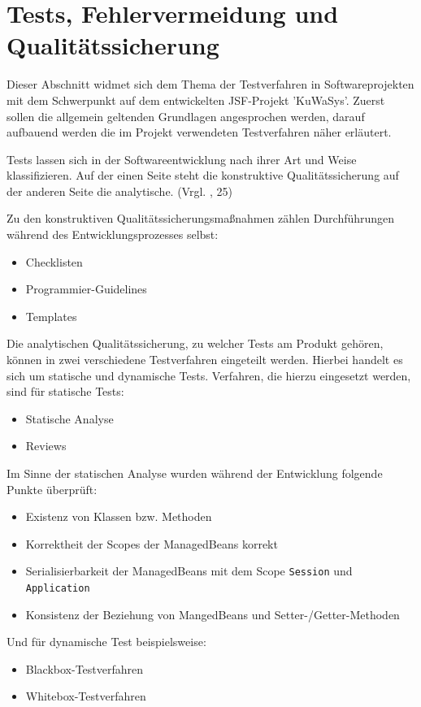 \section{Tests, Fehlervermeidung und Qualitätssicherung}\label{sec:Testing und Debugging}

Dieser Abschnitt widmet sich dem Thema der Testverfahren in Softwareprojekten mit dem Schwerpunkt auf dem entwickelten JSF-Projekt 'KuWaSys'.
Zuerst sollen die allgemein geltenden Grundlagen angesprochen werden, darauf aufbauend werden die im Projekt verwendeten Testverfahren näher erläutert. 

Tests lassen sich in der Softwareentwicklung nach ihrer Art und Weise klassifizieren.
Auf der einen Seite steht die konstruktive Qualitätssicherung auf der anderen Seite die analytische.
(Vrgl. \cite{RaM-ST}, 25) 

Zu den konstruktiven Qualitätssicherungsmaßnahmen zählen Durchführungen während des Entwicklungsprozesses selbst:
\begin{itemize}
  \item Checklisten
  \item Programmier-Guidelines
  \item Templates
\end{itemize}

Die analytischen Qualitätssicherung, zu welcher Tests am Produkt gehören, können in zwei verschiedene Testverfahren eingeteilt werden. Hierbei handelt es sich um statische und dynamische Tests.
Verfahren, die hierzu eingesetzt werden, sind für statische Tests:
\begin{itemize}
  \item Statische Analyse
  \item Reviews
\end{itemize}

Im Sinne der statischen Analyse wurden während der Entwicklung folgende Punkte überprüft:
\begin{itemize}
  \item Existenz von Klassen bzw. Methoden
  \item Korrektheit der Scopes der ManagedBeans korrekt
  \item Serialisierbarkeit der ManagedBeans mit dem Scope \texttt{Session} und \texttt{Application}
  \item Konsistenz der Beziehung von MangedBeans und Setter-/Getter-Methoden
\end{itemize}

Und für dynamische Test beispielsweise:
\begin{itemize}
  \item \gls{Blackbox}-Testverfahren
  \item \gls{Whitebox}-Testverfahren
\end{itemize}


